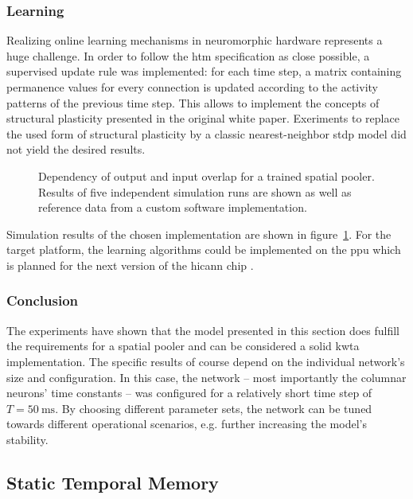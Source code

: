 \subsubsection{Learning}

Realizing online learning mechanisms in neuromorphic hardware represents a huge challenge. In order to follow the \gls{htm} specification as close possible, a supervised update rule was implemented: for each time step, a matrix containing permanence values for every connection is updated according to the activity patterns of the previous time step. This allows to implement the concepts of structural plasticity presented in the original white paper. Exeriments to replace the used form of structural plasticity by a classic nearest-neighbor \gls{stdp} model did not yield the desired results.

\begin{figure}
	\begin{center}
		
	\end{center}
	\caption{Dependency of output and input overlap for a trained spatial pooler. Results of five independent simulation runs are shown as well as reference data from a custom software implementation.}
	\label{fig:spatial_pooler_learning}
\end{figure}

Simulation results of the chosen implementation are shown in figure~\ref{fig:spatial_pooler_learning}. For the target platform, the learning algorithms could be implemented on the \gls{ppu} which is planned for the next version of the \gls{hicann} chip \citep{friedmann2013phd}.

\subsubsection{Conclusion}

The experiments have shown that the model presented in this section does fulfill the requirements for a spatial pooler and can be considered a solid \gls{kwta} implementation. The specific results of course depend on the individual network's size and configuration. In this case, the network -- most importantly the columnar neurons' time constants -- was configured for a relatively short time step of $T = \SI{50}{\milli\second}$. By choosing different parameter sets, the network can be tuned towards different operational scenarios, e.g. further increasing the model's stability.

\subsection{Static Temporal Memory}

